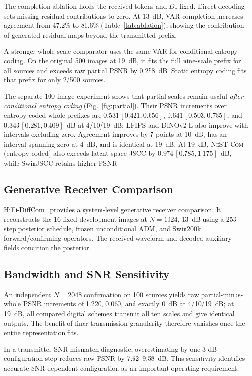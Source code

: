 \documentclass[journal]{IEEEtran}
\newcommand{\ec}{\textsc{NeST-Com} (entropy-coded)}
\newif\ifqualitative
\begin{document}
The completion ablation holds the received tokens and $D_c$ fixed. Direct decoding sets missing residual contributions to zero. At 13~dB, VAR completion increases agreement from 47.2\% to 81.6\% (Table~\ref{tab:ablation}), showing the contribution of generated residual maps beyond the transmitted prefix.


A stronger whole-scale comparator uses the same VAR for conditional entropy coding. On the original 500 images at 19~dB, it fits the full nine-scale prefix for all sources and exceeds raw partial PSNR by 0.258~dB. Static entropy coding fits that prefix for only 2/500 sources.

The separate 100-image experiment shows that partial scales remain useful \emph{after conditional entropy coding} (Fig.~\ref{fig:partial}). Their PSNR increments over entropy-coded whole prefixes are $0.531\,[0.421,0.656]$, $0.641\,[0.503,0.785]$, and $0.343\,[0.281,0.409]$~dB at 4/10/19~dB; LPIPS and DINOv2-L also improve with intervals excluding zero. Agreement improves by 7 points at 10~dB, has an interval spanning zero at 4~dB, and is identical at 19~dB. At 19~dB, \ec{} also exceeds latent-space JSCC by $0.974\,[0.785,1.175]$~dB, while SwinJSCC retains higher PSNR.

\subsection{Generative Receiver Comparison}

HiFi-DiffCom~\cite{wang2025diffcom} provides a system-level generative receiver comparison\ifqualitative{} (Fig.~\ref{fig:qualitative})\fi. It reconstructs the 16 fixed development images at $N=1024$, 13~dB using a 253-step posterior schedule, frozen unconditional ADM, and Swin200k forward/confirming operators. The received waveform and decoded auxiliary fields condition the posterior.

\subsection{Bandwidth and SNR Sensitivity} An independent $N=2048$ confirmation on 100 sources yields raw partial-minus-whole PSNR increments of 1.220, 0.060, and exactly 0~dB at 4/10/19~dB; at 19~dB, all compared digital schemes transmit all ten scales and give identical outputs. The benefit of finer transmission granularity therefore vanishes once the entire representation fits.

In a transmitter-SNR mismatch diagnostic, overestimating by one 3-dB configuration step reduces raw PSNR by 7.62--9.58~dB. This sensitivity identifies accurate SNR-dependent configuration as an important operating requirement.
\end{document}

